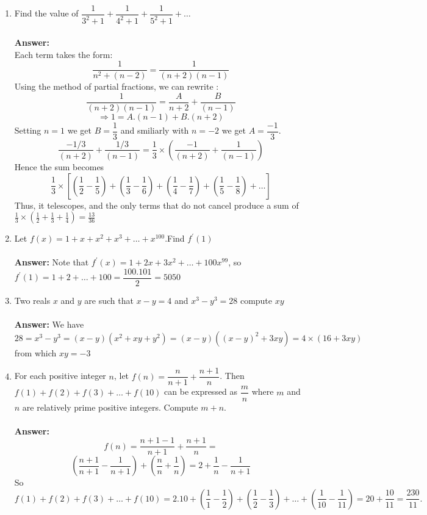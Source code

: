 \documentclass[a4paper]{article}
\begin{document}
\begin{enumerate}
    \item  Find the value of $\dfrac{1}{3^2+1}+
        \dfrac{1}{4^2+1}+\dfrac{1}{5^2+1} + \dots$
        \\ \\
        \textbf{Answer:} \\
        Each term takes the form:
        $$ \dfrac{1}{n^2 + (n-2)} = \dfrac{1}{(n+2)(n-1)}$$
        Using the method of partial fractions, we can rewrite :
        $$ \dfrac{1}{(n+2)(n-1)} = \dfrac{A}{n+2} + \dfrac{B}{(n-1)}$$
        $$ \Rightarrow 1 = A.(n-1) + B.(n+2)$$
        Setting $n=1$ we get $B=\dfrac{1}{3}$ and smiliarly with $n=-2$ we 
        get $A=\dfrac{-1}{3}$. 
        \[
            \dfrac{-1/3}{(n+2)} + \dfrac{1/3}{(n-1)} = \dfrac{1}{3} \times (\dfrac{-1}{(n+2)} + \dfrac{1}{(n-1)})
        \] Hence the sum becomes
        \[
           \displaystyle \frac{1}{3} \times [(\frac{1}{2}-\frac{1}{5}) + (\frac{1}{3}-\frac{1}{6})
           +(\frac{1}{4}-\frac{1}{7}) + (\frac{1}{5} - \frac{1}{8})+  \dots]
        \]
        Thus, it telescopes, and the only terms that do not cancel produce a sum of $\frac{1}{3} \times
        (\frac{1}{2} + \frac{1}{3} + \frac{1}{4}) = \frac{13}{36}$
    \item Let $f(x) = 1 + x + x^2 + x^3 + \dots+ x^{100}$.Find $f^\prime(1)$
        \\ \\
        \textbf{Answer:}
        Note that $f^\prime(x) = 1 + 2x + 3x^2 + \dots + 100x^{99}
        $, so $f^\prime(1) = 1+2+\dots+100 = \dfrac{100.101}{2} = 5050$
    \item Two reals $x$ and $y$ are such that $x - y = 4$ and $x^3 - y^3 = 28$ compute $xy$ 
        \\ \\
        \textbf{Answer:}
        We have $$28 = x^3 -y^3 = (x-y)(x^2 + xy + y^2) = (x-y)((x-y)^2 + 3xy) = 4 \times(16 + 3xy)$$
        from which $xy = -3$
    \item  For each positive integer $n$, let $f(n) = \dfrac{n}{n+1} + \dfrac{n+1}{n}$. Then $f (1) + f (2) + f (3) + 
    \dots + f (10)$ can be expressed as $\dfrac{m}{n}$ where $m$ and $n$ are relatively prime positive integers. Compute $m + n$.
        \\ \\
        \textbf{Answer:}
        \[
            f(n) = \frac{n+1-1}{n+1} + \frac{n+1}{n} = 
        \]
        \[
            (\frac{n+1}{n+1} - \frac{1}{n+1}) + (\frac{n}{n} + \frac{1}{n}) = 2 + \frac{1}{n}
             - \frac{1}{n+1}
        \]
        So 
        \[
            f(1) + f(2) + f(3) + \dots + f(10) = 2.10  + (\frac{1}{1} - \frac{1}{2}) + (\frac{1}{2} - \frac{1}{3}) + \dots
             + (\frac{1}{10} - \frac{1}{11}) = 20 + \frac{10}{11} =  \frac{230}{11}.
        \]
\end{enumerate}
\end{document}
